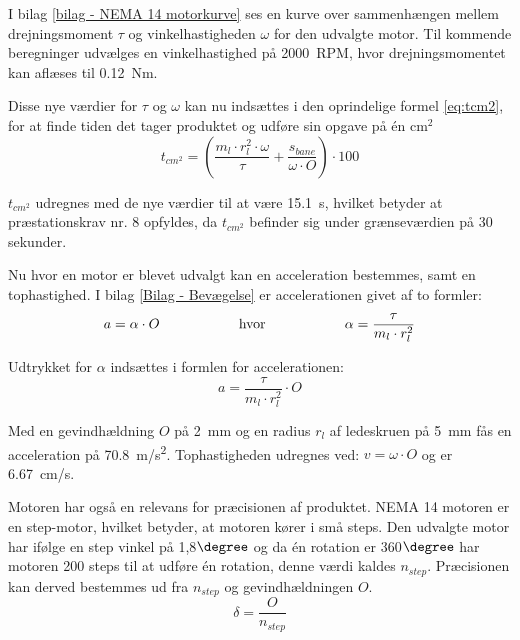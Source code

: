 I bilag \ref{bilag - NEMA 14 motorkurve} ses en kurve over sammenhængen mellem drejningsmoment \(\tau\) og vinkelhastigheden \(\omega\) for den udvalgte motor. Til kommende beregninger udvælges en vinkelhastighed på \SI{2000}{RPM}, hvor drejningsmomentet kan aflæses til \SI{0.12}{Nm}. 

Disse nye værdier for \(\tau\) og \(\omega\) kan nu indsættes i den oprindelige formel \ref{eq:tcm2}, for at finde tiden det tager produktet og udføre sin opgave på én cm\(^2\)
\begin{equation}
    t_{cm^2}=\left(\dfrac{m_{l}\cdot r_{l}^2\cdot \omega}{\tau}+\dfrac{s_{bane}}{\omega\cdot O}\right) \cdot 100
\end{equation}

\(t_{cm^2}\) udregnes med de nye værdier til at være \SI{15,1}{s}, hvilket betyder at præstationskrav nr. 8 opfyldes, da \(t_{cm^2}\) befinder sig under grænseværdien på 30 sekunder.

Nu hvor en motor er blevet udvalgt kan en acceleration bestemmes, samt en tophastighed. I bilag \ref{Bilag - Bevægelse} er accelerationen givet af to formler: \\
\begin{equation}
\begin{aligned}
a = \alpha \cdot O \hspace{20mm} \text{hvor} \hspace{20mm} \alpha = \dfrac{\tau}{m_{l}\cdot r_{l}^2}
\end{aligned}
\end{equation}

Udtrykket for \(\alpha\) indsættes i formlen for accelerationen:
\begin{equation}
    a=\dfrac{\tau}{m_{l}\cdot r_{l}^2}\cdot O
\end{equation}

Med en gevindhældning \(O\) på \SI{2}{mm} og en radius \(r_{l}\) af ledeskruen på \SI{5}{mm} fås en acceleration på \SI{70,8}{m/s^2}. Tophastigheden udregnes ved: \(v=\omega\cdot O\) og er \SI{6,67}{cm/s}.

Motoren har også en relevans for præcisionen af produktet. NEMA 14 motoren er en step-motor, hvilket betyder, at motoren kører i små steps. Den udvalgte motor har ifølge \parencite{Igus2025DrylinNEMA14} en step vinkel på 1,8\(\degree\) og da én rotation er 360\(\degree\) har motoren 200 steps til at udføre én rotation, denne værdi kaldes \(n_{step}\). Præcisionen kan derved bestemmes ud fra \(n_{step}\) og gevindhældningen \(O\).
\begin{equation}
    \delta=\dfrac{O}{n_{step}}
\end{equation}

